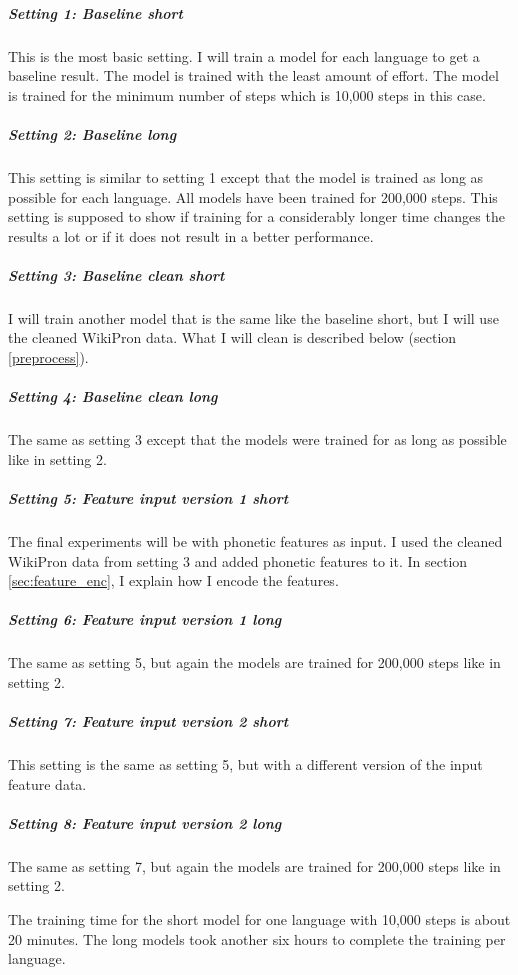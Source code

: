 \subparagraph{Setting 1: Baseline short}
This is the most basic setting. I will train a model for each language to get a baseline result. The model is trained with the least amount of effort. The model is trained for the minimum number of steps which is 10,000 steps in this case. 

\subparagraph{Setting 2: Baseline long}
This setting is similar to setting 1 except that the model is trained as long as possible for each language. All models have been trained for 200,000 steps. This setting is supposed to show if training for a considerably longer time changes the results a lot or if it does not result in a better performance.

\subparagraph{Setting 3: Baseline clean short}
I will train another model that is the same like the baseline short, but I will use the cleaned WikiPron data. What I will clean is described below (section \ref{preprocess}).

\subparagraph{Setting 4: Baseline clean long}
The same as setting 3 except that the models were trained for as long as possible like in setting 2.

\subparagraph{Setting 5: Feature input version 1 short}
The final experiments will be with phonetic features as input. I used the cleaned WikiPron data from setting 3 and added phonetic features to it. In section \ref{sec:feature_enc}, I explain how I encode the features. 

\subparagraph{Setting 6: Feature input version 1 long}
The same as setting 5, but again the models are trained for 200,000 steps like in setting 2.

\subparagraph{Setting 7: Feature input version 2 short}
This setting is the same as setting 5, but with a different version of the input feature data.

\subparagraph{Setting 8: Feature input version 2 long}
The same as setting 7, but again the models are trained for 200,000 steps like in setting 2.


The training time for the short model for one language with 10,000 steps is about 20 minutes. The long models took another six hours to complete the training per language.


